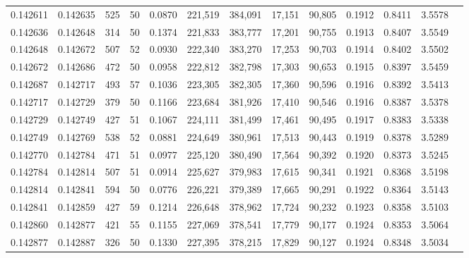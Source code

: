 \begin{tabular}{rrrrrrrrrrrrr}
0.142611 & 0.142635 &   525 &  50 &                                     0.0870 & 221,519 & 384,091 &  17,151 &  90,805 & 0.1912 & 0.8411 & 3.5578 \\
0.142636 & 0.142648 &   314 &  50 &                                     0.1374 & 221,833 & 383,777 &  17,201 &  90,755 & 0.1913 & 0.8407 & 3.5549 \\
0.142648 & 0.142672 &   507 &  52 &                                     0.0930 & 222,340 & 383,270 &  17,253 &  90,703 & 0.1914 & 0.8402 & 3.5502 \\
0.142672 & 0.142686 &   472 &  50 &                                     0.0958 & 222,812 & 382,798 &  17,303 &  90,653 & 0.1915 & 0.8397 & 3.5459 \\
0.142687 & 0.142717 &   493 &  57 &                                     0.1036 & 223,305 & 382,305 &  17,360 &  90,596 & 0.1916 & 0.8392 & 3.5413 \\
0.142717 & 0.142729 &   379 &  50 &                                     0.1166 & 223,684 & 381,926 &  17,410 &  90,546 & 0.1916 & 0.8387 & 3.5378 \\
0.142729 & 0.142749 &   427 &  51 &                                     0.1067 & 224,111 & 381,499 &  17,461 &  90,495 & 0.1917 & 0.8383 & 3.5338 \\
0.142749 & 0.142769 &   538 &  52 &                                     0.0881 & 224,649 & 380,961 &  17,513 &  90,443 & 0.1919 & 0.8378 & 3.5289 \\
0.142770 & 0.142784 &   471 &  51 &                                     0.0977 & 225,120 & 380,490 &  17,564 &  90,392 & 0.1920 & 0.8373 & 3.5245 \\
0.142784 & 0.142814 &   507 &  51 &                                     0.0914 & 225,627 & 379,983 &  17,615 &  90,341 & 0.1921 & 0.8368 & 3.5198 \\
0.142814 & 0.142841 &   594 &  50 &                                     0.0776 & 226,221 & 379,389 &  17,665 &  90,291 & 0.1922 & 0.8364 & 3.5143 \\
0.142841 & 0.142859 &   427 &  59 &                                     0.1214 & 226,648 & 378,962 &  17,724 &  90,232 & 0.1923 & 0.8358 & 3.5103 \\
0.142860 & 0.142877 &   421 &  55 &                                     0.1155 & 227,069 & 378,541 &  17,779 &  90,177 & 0.1924 & 0.8353 & 3.5064 \\
0.142877 & 0.142887 &   326 &  50 &                                     0.1330 & 227,395 & 378,215 &  17,829 &  90,127 & 0.1924 & 0.8348 & 3.5034 \\

\end{tabular}
